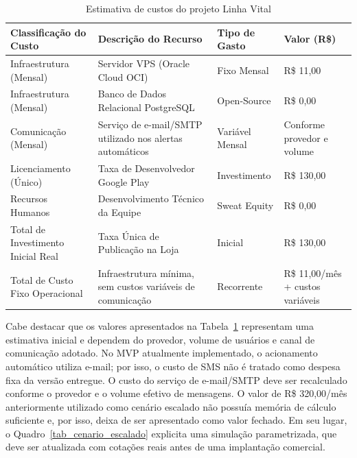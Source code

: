 \begin{table}[H]
\caption{Estimativa de custos do projeto Linha Vital}
\label{tab_custos}
\centering
\footnotesize

\begin{tabular}{|p{3.8cm}|p{4.8cm}|p{2.9cm}|p{2.5cm}|}
\hline
\textbf{Classificação do Custo} & \textbf{Descrição do Recurso} & \textbf{Tipo de Gasto} & \textbf{Valor (R\$)} \\
\hline

Infraestrutura (Mensal) &
Servidor VPS (Oracle Cloud OCI) &
Fixo Mensal &
R\$ 11,00 \\
\hline

Infraestrutura (Mensal) &
Banco de Dados Relacional PostgreSQL &
Open-Source &
R\$ 0,00 \\
\hline

Comunicação (Mensal) &
Serviço de e-mail/SMTP utilizado nos alertas automáticos &
Variável Mensal &
Conforme provedor e volume \\
\hline

Licenciamento (Único) &
Taxa de Desenvolvedor Google Play &
Investimento &
R\$ 130,00 \\
\hline

Recursos Humanos &
Desenvolvimento Técnico da Equipe &
Sweat Equity &
R\$ 0,00 \\
\hline

Total de Investimento Inicial Real &
Taxa Única de Publicação na Loja &
Inicial &
R\$ 130,00 \\
\hline

Total de Custo Fixo Operacional &
Infraestrutura mínima, sem custos variáveis de comunicação &
Recorrente &
R\$ 11,00/mês + custos variáveis \\
\hline

\end{tabular}

\normalsize

\end{table}

Cabe destacar que os valores apresentados na Tabela~\ref{tab_custos} representam uma estimativa inicial e dependem do provedor, volume de usuários e canal de comunicação adotado. No MVP atualmente implementado, o acionamento automático utiliza e-mail; por isso, o custo de SMS não é tratado como despesa fixa da versão entregue. O custo do serviço de e-mail/SMTP deve ser recalculado conforme o provedor e o volume efetivo de mensagens. O valor de R\$ 320,00/mês anteriormente utilizado como cenário escalado não possuía memória de cálculo suficiente e, por isso, deixa de ser apresentado como valor fechado. Em seu lugar, o Quadro~\ref{tab_cenario_escalado} explicita uma simulação parametrizada, que deve ser atualizada com cotações reais antes de uma implantação comercial.

